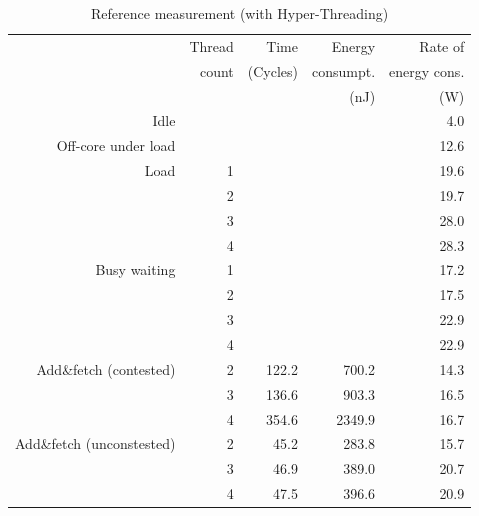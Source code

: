 \documentclass[a4paper, 10pt]{article}
\begin{document}
\begin{table}[htbp]
	\centering
	\caption{Reference measurement (with Hyper-Threading)}
	\vspace{0.2cm}
	\begin{tabular}{r | r | r r r}
		                          & Thread & Time     & Energy    & Rate of      \\
		                          & count  & (Cycles) & consumpt. & energy cons. \\
		                          &        &          & (nJ)      & (W)          \\
		\hline
		Idle                      &        &          &           &  4.0 \\
		\arrayrulecolor{lightgray}\hline\arrayrulecolor{black}
		Off-core under load       &        &          &           & 12.6 \\
		\arrayrulecolor{lightgray}\hline\arrayrulecolor{black}
		Load                      & 1      &          &           & 19.6 \\
		                          & 2      &          &           & 19.7 \\
		                          & 3      &          &           & 28.0 \\
		                          & 4      &          &           & 28.3 \\
		\arrayrulecolor{lightgray}\hline\arrayrulecolor{black}
		Busy waiting              & 1      &          &           & 17.2 \\
		                          & 2      &          &           & 17.5 \\
		                          & 3      &          &           & 22.9 \\
		                          & 4      &          &           & 22.9 \\
		\hline
		Add\&fetch (contested)    & 2      &    122.2 &     700.2 & 14.3 \\
		                          & 3      &    136.6 &     903.3 & 16.5 \\
		                          & 4      &    354.6 &    2349.9 & 16.7 \\
		\arrayrulecolor{lightgray}\hline\arrayrulecolor{black}
		Add\&fetch (unconstested) & 2      &     45.2 &     283.8 & 15.7 \\
		                          & 3      &     46.9 &     389.0 & 20.7 \\
		                          & 4      &     47.5 &     396.6 & 20.9 \\

\end{tabular}
\end{table}
\end{document}
